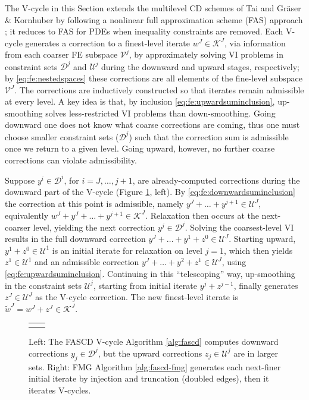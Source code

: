 \documentclass[review,hidelinks,onefignum,onetabnum]{siamart220329}
\begin{document}
The V-cycle in this Section extends the multilevel CD schemes of Tai \cite{Tai2003} and Gr\"aser \& Kornhuber \cite[Algorithm 4.2]{GraeserKornhuber2009} by following a nonlinear full approximation scheme (FAS) approach \cite{BrandtLivne2011}; it reduces to FAS for PDEs when inequality constraints are removed.  Each V-cycle generates a correction to a finest-level iterate $w^J \in \mathcal{K}^J$, via information from each coarser FE subspace $\mathcal{V}^j$, by approximately solving VI problems in constraint sets $\mathcal{D}^j$ and $\mathcal{U}^j$ during the downward and upward stages, respectively; by \eqref{eq:fe:nestedspaces} these corrections are all elements of the fine-level subspace $\mathcal{V}^J$.  The corrections are inductively constructed so that iterates remain admissible at every level.  A key idea is that, by inclusion \eqref{eq:fe:upwardsuminclusion}, up-smoothing solves less-restricted VI problems than down-smoothing.  Going downward one does not know what coarse corrections are coming, thus one must choose smaller constraint sets ($\mathcal{D}^j$) such that the correction sum is admissible once we return to a given level.  Going upward, however, no further coarse corrections can violate admissibility.

Suppose $y^i \in \mathcal{D}^i$, for $i=J,\dots,j+1$, are already-computed corrections during the downward part of the V-cycle (Figure \ref{fig:fascdcycles}, left).  By \eqref{eq:fe:downwardsuminclusion} the correction at this point is admissible, namely $y^J + \dots + y^{j+1} \in \mathcal{U}^J$, equivalently $w^J + y^J + \dots + y^{j+1} \in \mathcal{K}^J$.  Relaxation then occurs at the next-coarser level, yielding the next correction $y^j \in \mathcal{D}^j$.  Solving the coarsest-level VI results in the full downward correction $y^J + \dots + y^1 + z^0 \in \mathcal{U}^J$.  Starting upward, $y^1 + z^0 \in \mathcal{U}^1$ is an initial iterate for relaxation on level $j=1$, which then yields $z^1 \in \mathcal{U}^1$ and an admissible correction $y^J + \dots + y^2 + z^1 \in \mathcal{U}^J$, using \eqref{eq:fe:upwardsuminclusion}.  Continuing in this ``telescoping'' way, up-smoothing in the constraint sets $\mathcal{U}^j$, starting from initial iterate $y^j+z^{j-1}$, finally generates $z^J\in \mathcal{U}^J$ as the V-cycle correction.  The new finest-level iterate is $\tilde{w}^J = w^J + z^J \in \mathcal{K}^J$.

\begin{figure}[ht]
\centering
\begin{tabular}{cc}

&

\end{tabular}
\caption{Left: The FASCD V-cycle Algorithm \ref{alg:fascd} computes downward corrections $y_j \in \mathcal{D}^j$, but the upward corrections $z_j\in\mathcal{U}^j$ are in larger sets. Right: FMG Algorithm \ref{alg:fascd-fmg} generates each next-finer initial iterate by injection and truncation (doubled edges), then it iterates V-cycles.}
\label{fig:fascdcycles}
\end{figure}
\end{document}
